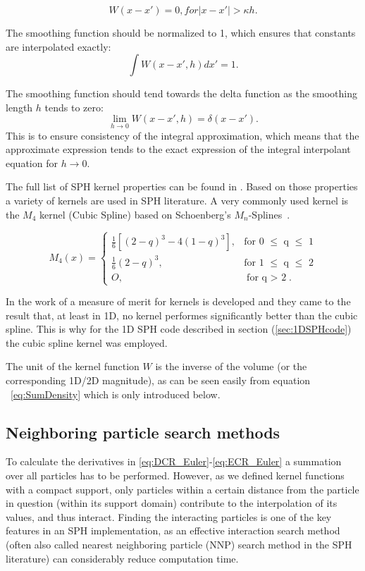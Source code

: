 \documentclass{report}
\begin{document}
\begin{equation}
W(x-x')=0,\textit{for}|x-x'|>\kappa h.
\end{equation}

The smoothing function should be normalized to 1, which ensures that constants
are interpolated exactly:
\begin{equation}
\int{W(x-x',h)dx'}=1.
\end{equation}

The smoothing function should tend towards the delta function as the smoothing
length $h$ tends to zero:
\begin{equation}
\lim\limits_{h \rightarrow 0}{W(x-x',h)}=\delta(x-x').
\end{equation}
This is to ensure consistency of the integral approximation, which means that
the approximate expression tends to the exact expression of the integral
interpolant equation for $h \rightarrow 0$.

The full list of SPH kernel properties can be found in  \cite{Liu2003}.
Based on those properties a variety of kernels are used in SPH literature. A
very commonly used kernel is the $M_4$ kernel (Cubic Spline) based on Schoenberg's
$M_n$-Splines~\cite{Schoenberg1946}.

\begin{equation}
\label{eq:cubicSpline}
M_{4}(x)=\begin{cases}
\frac{1}{6}[(2-q)^{3}-4(1-q)^{3}],& \text{for 0 $\leq$ q $\leq$ 1} \\
\frac{1}{6}(2-q)^{3},&  \text{for 1 $\leq$ q $\leq$ 2} \\
O,& \text{for q $>$ 2}.
\end{cases}
\end{equation}


In the work of \cite{Fulk1996} a measure of merit for kernels is developed and
they came to the result that, at least in 1D, no kernel performes significantly better
than the cubic spline.
This is why for the 1D SPH code described in section (\ref{sec:1DSPHcode}) the cubic
spline kernel was employed.

The unit of the kernel function $W$ is the inverse of the volume (or the corresponding 1D/2D magnitude), as can be seen easily from equation ~\ref{eq:SumDensity} which is only introduced below.


\subsection{Neighboring particle search methods}
\label{sec:NNPS}
To calculate the derivatives in \ref{eq:DCR_Euler}-\ref{eq:ECR_Euler} a
summation over all particles has to be performed. However, as we defined kernel
functions with a compact support, only particles within a certain distance from
the particle in question (within its support domain) contribute to the
interpolation of its values, and thus interact. Finding the interacting
particles is one of the key features in an SPH implementation, as an effective
interaction search method (often also called nearest neighboring particle (NNP)
search method in the SPH literature) can considerably reduce
computation time. 
\end{document}
